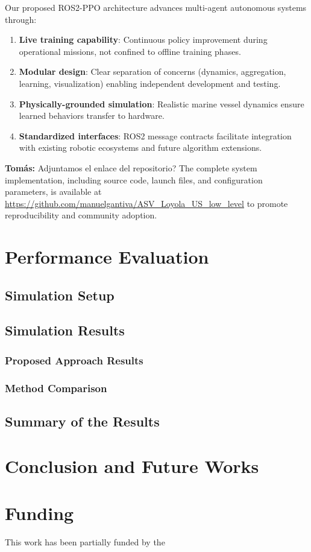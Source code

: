 \documentclass[preprint,3p]{elsarticle}
\newcommand{\tcom}[1]{{ \color{blue}\textbf{Tomás:} #1}}
\begin{document}
Our proposed ROS2-PPO architecture advances multi-agent autonomous systems through:
\begin{enumerate}
    \item \textbf{Live training capability}: Continuous policy improvement during operational missions, not confined to offline training phases.
    \item \textbf{Modular design}: Clear separation of concerns (dynamics, aggregation, learning, visualization) enabling independent development and testing.
    \item \textbf{Physically-grounded simulation}: Realistic marine vessel dynamics ensure learned behaviors transfer to hardware.
    \item \textbf{Standardized interfaces}: ROS2 message contracts facilitate integration with existing robotic ecosystems and future algorithm extensions.
\end{enumerate}

\tcom{Adjuntamos el enlace del repositorio?}
The complete system implementation, including source code, launch files, and configuration parameters, is available at \url{https://github.com/manuelgantiva/ASV_Loyola_US_low_level} to promote reproducibility and community adoption.


\section{Performance Evaluation}
\label{performance}



\subsection{Simulation Setup}



\subsection{Simulation Results}

\subsubsection{Proposed Approach Results}

\subsubsection{Method Comparison}


\subsection{Summary of the Results}


\section{Conclusion and Future Works}
\label{conclusion}



\section*{Funding}
This work has been partially funded by the 

  
 
\end{document}
